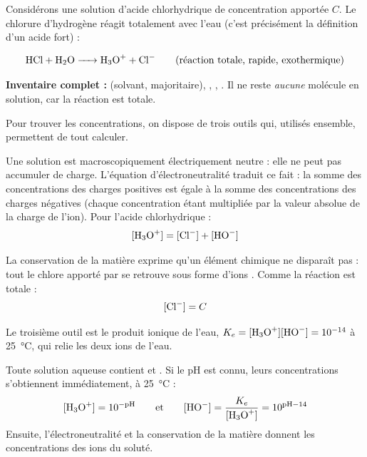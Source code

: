 \documentclass[11pt]{article}
\newcommand{\cle}[1]{{\popxbold\color{popdark}#1}}
\begin{document}
Considérons une solution d'acide chlorhydrique de concentration apportée $C$. Le chlorure d'hydrogène  réagit totalement avec l'eau (c'est précisément la définition d'un acide fort) :

\[ \ce{HCl + H2O -> H3O+ + Cl-} \qquad \text{(réaction totale, rapide, exothermique)} \]

\textbf{Inventaire complet :}  (solvant, majoritaire), , , . Il ne reste \emph{aucune} molécule  en solution, car la réaction est totale.

Pour trouver les concentrations, on dispose de trois outils qui, utilisés ensemble, permettent de tout calculer.

\begin{definition}
Une solution est macroscopiquement \cle{électriquement neutre} : elle ne peut pas accumuler de charge. L'\cle{équation d'électroneutralité} traduit ce fait : la somme des concentrations des charges positives est égale à la somme des concentrations des charges négatives (chaque concentration étant multipliée par la valeur absolue de la charge de l'ion). Pour l'acide chlorhydrique :
\[ [\ce{H3O+}] = [\ce{Cl-}] + [\ce{HO-}] \]
\end{definition}

\begin{definition}
La \cle{conservation de la matière} exprime qu'un élément chimique ne disparaît pas : tout le chlore apporté par  se retrouve sous forme d'ions . Comme la réaction est totale :
\[ [\ce{Cl-}] = C \]
\end{definition}

Le troisième outil est le produit ionique de l'eau, $K_e = [\ce{H3O+}][\ce{HO-}] = 10^{-14}$ à \SI{25}{\celsius}, qui relie les deux ions de l'eau.

\begin{methode}
Toute solution aqueuse contient  et . Si le pH est connu, leurs concentrations s'obtiennent immédiatement, à \SI{25}{\celsius} :
\[ [\ce{H3O+}] = 10^{-\mathrm{pH}} \qquad\text{et}\qquad [\ce{HO-}] = \frac{K_e}{[\ce{H3O+}]} = 10^{\mathrm{pH}-14} \]
Ensuite, l'électroneutralité et la conservation de la matière donnent les concentrations des ions du soluté.
\end{methode}
\end{document}
